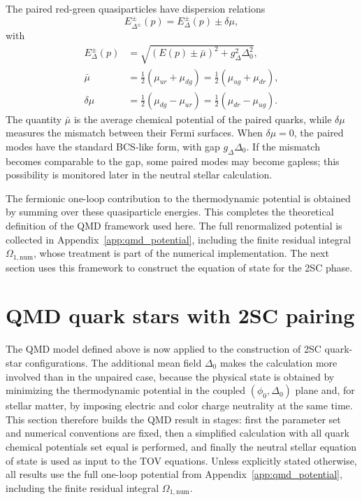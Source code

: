 The paired red-green quasiparticles have dispersion relations
\begin{equation}
E_{\Delta^\pm}^{\pm}(p)
=
E_\Delta^\pm(p)\pm\delta\mu ,
\label{eq:qmd_paired_spectrum}
\end{equation}
with
\begin{align}
E_\Delta^\pm(p)
&=
\sqrt{
\left(E(p)\pm\bar{\mu}\right)^2
+
g_\Delta^2\Delta_0^2
},
\\
\bar{\mu}
&=
\frac{1}{2}\left(\mu_{ur}+\mu_{dg}\right)
=
\frac{1}{2}\left(\mu_{ug}+\mu_{dr}\right),
\\
\delta\mu
&=
\frac{1}{2}\left(\mu_{dg}-\mu_{ur}\right)
=
\frac{1}{2}\left(\mu_{dr}-\mu_{ug}\right).
\end{align}
The quantity \(\bar{\mu}\) is the average chemical potential of the paired
quarks, while \(\delta\mu\) measures the mismatch between their Fermi
surfaces. When \(\delta\mu=0\), the paired modes have the standard
BCS-like form, with gap \(g_\Delta\Delta_0\). If the mismatch becomes
comparable to the gap, some paired modes may become gapless; this
possibility is monitored later in the neutral stellar calculation.

The fermionic one-loop contribution to the thermodynamic potential is
obtained by summing over these quasiparticle energies. This completes the
theoretical definition of the QMD framework used here. The full
renormalized potential is collected in Appendix~\ref{app:qmd_potential},
including the finite residual integral \(\Omega_{1,\mathrm{num}}\), whose
treatment is part of the numerical implementation. The next section uses
this framework to construct the equation of state for the 2SC phase.

\section{QMD quark stars with 2SC pairing}
\label{sec:qmd_section1}

The QMD model defined above is now applied to the
construction of 2SC quark-star configurations. The additional mean field
\(\Delta_0\) makes the calculation more involved than in the unpaired
case, because the physical state is obtained by minimizing the
thermodynamic potential in the coupled \((\phi_0,\Delta_0)\) plane and,
for stellar matter, by imposing electric and color charge neutrality at the
same time. This section therefore builds the QMD result in stages: first
the parameter set and numerical conventions are fixed, then a
simplified calculation with all quark chemical potentials set equal is
performed, and finally the neutral stellar equation of state is used as input
to the TOV equations. Unless explicitly stated otherwise, all results use
the full one-loop potential from Appendix~\ref{app:qmd_potential},
including the finite residual integral \(\Omega_{1,\mathrm{num}}\).


